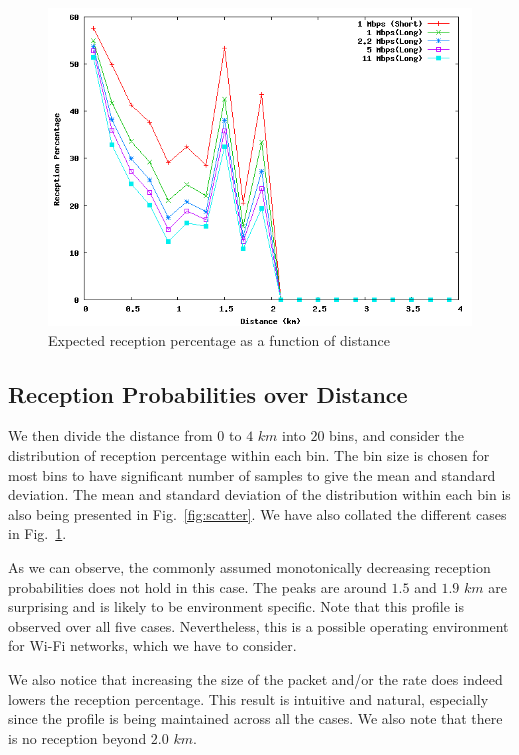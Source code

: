 \documentclass[11pt,twocolumn]{article}
\begin{document}
\begin{figure}[ht]
\centering
\includegraphics[width=0.8\linewidth]{Distro}
\caption{Expected reception percentage as a function of distance}
\label{fig:prob}
\end{figure}

\subsection{Reception Probabilities over Distance}
We then divide the distance from $0$ to $4$ $km$ into $20$ bins, and consider the distribution of reception percentage within each bin.  The bin size is chosen for most bins to have significant number of samples to give the mean and standard deviation.  The mean and standard deviation of the distribution within each bin is also being presented in Fig.~\ref{fig:scatter}.  We have also collated the different cases in Fig.~\ref{fig:prob}.  

As we can observe, the commonly assumed monotonically decreasing reception probabilities does not hold in this case.  The peaks are around $1.5$ and $1.9$ $km$ are surprising and is likely to be environment specific.  Note that this profile is observed over all five cases.  Nevertheless, this is a possible operating environment for Wi-Fi networks, which we have to consider.

We also notice that increasing the size of the packet and/or the rate does indeed lowers the reception percentage.  This result is intuitive and natural, especially since the profile is being maintained across all the cases.  We also note that there is no reception beyond $2.0$ $km$.
\end{document}
